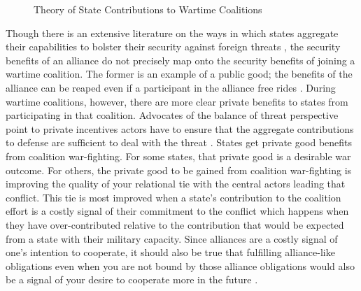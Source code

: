 \documentclass[12pt,letterpaper]{article}
\begin{document}
		\begin{figure}[H]
			\centering
			\caption{Theory of State Contributions to Wartime Coalitions}
			\label{fig:theory}
		\end{figure}

		Though there is an extensive literature on the ways in which states aggregate their capabilities to bolster their security against foreign threats \citep{waltz_theoryinternationalpolitics_1979}, the security benefits of an alliance do not precisely map onto the security benefits of joining a wartime coalition. The former is an example of a public good; the benefits of the alliance can be reaped even if a participant in the alliance free rides \citep{olson_economictheoryalliances_1966}. During wartime coalitions, however, there are more clear private benefits to states from participating in that coalition. Advocates of the balance of threat perspective point to private incentives actors have to ensure that the aggregate contributions to defense are sufficient to deal with the threat \citep{bennett_friendsneedburden_1997, baltrusaitis_coalitionpoliticsiraq_2010, davidson_neoclassicalrealistexplanation_2011}. States get private good benefits from coalition war-fighting. For some states, that private good is a desirable war outcome.  For others, the private good to be gained from coalition war-fighting is improving the quality of your relational tie with the central actors leading that conflict. This tie is most improved when a state's contribution to the coalition effort is a costly signal of their commitment to the conflict which happens when they have over-contributed relative to the contribution that would be expected from a state with their military capacity. Since alliances are a costly signal of one's intention to cooperate, it should also be true that fulfilling alliance-like obligations even when you are not bound by those alliance obligations would also be a signal of your desire to cooperate more in the future \citep{warren_geometrysecuritymodeling_2010}.
\end{document}
